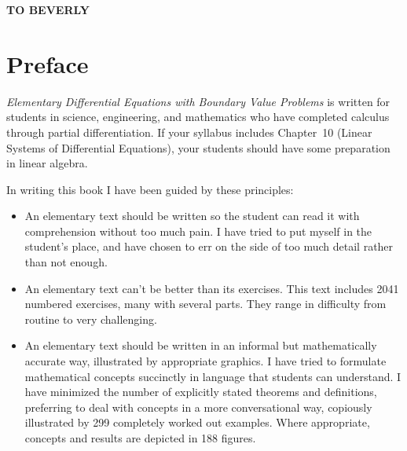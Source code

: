 \vspace*{.51in}

\newpage

\noindent
\thispagestyle{empty}
\vspace*{3in}
\centerline{\color{blue}\bf\Huge TO BEVERLY}

\newpage

\frontmatter

\tableofcontents

\setlength{\parindent}{10pt}

\chapter{Preface}

\noindent
{\color{blue}\it Elementary Differential Equations with Boundary Value Problems\/} is written for
students in science, engineering, and mathematics who have completed calculus through partial
differentiation. If your syllabus includes Chapter~10 (Linear Systems of Differential Equations),
your students should have some preparation in linear algebra.

In writing this book I have been guided by these principles:

\begin{itemize}
  \item An elementary text should be written so the student can read it with comprehension without
        too much pain. I have tried to put myself in the student's place, and have chosen to err on
        the side of too much detail rather than not enough.

  \item An elementary text can't be better than its exercises. This text includes 2041 numbered
        exercises, many with several parts. They range in difficulty from routine to very
        challenging.

  \item An elementary text should be written in an informal but mathematically accurate way,
        illustrated by appropriate graphics. I have tried to formulate mathematical concepts
        succinctly in language that students can understand. I have minimized the number of
        explicitly stated theorems and definitions, preferring to deal with concepts in a more
        conversational way, copiously illustrated by 299 completely worked out examples. Where
        appropriate, concepts and results are depicted in 188 figures.
\end{itemize}

